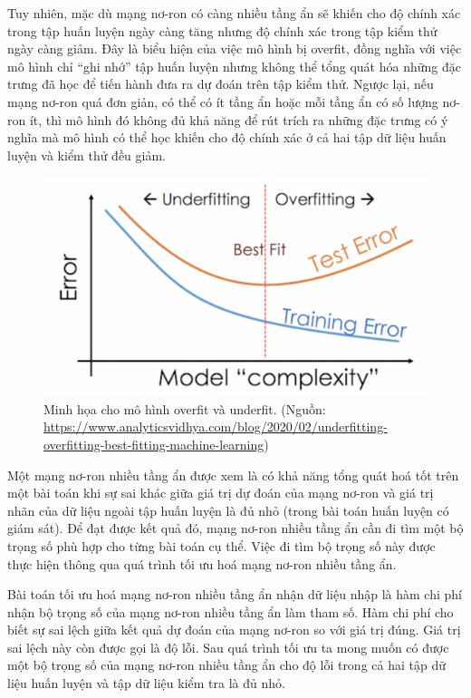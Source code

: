 Tuy nhiên, mặc dù mạng nơ-ron có càng nhiều tầng ẩn sẽ khiến cho độ chính xác trong tập huấn luyện ngày càng tăng nhưng độ chính xác trong tập kiểm thử ngày càng giảm. Đây là biểu hiện của việc mô hình bị overfit, đồng nghĩa với việc mô hình chỉ ``ghi nhớ'' tập huấn luyện nhưng không thể tổng quát hóa những đặc trưng đã học để tiến hành đưa ra dự đoán trên tập kiểm thử. Ngược lại, nếu mạng nơ-ron quá đơn giản, có thể có ít tầng ẩn hoặc mỗi tầng ẩn có số lượng nơ-ron ít, thì mô hình đó không đủ khả năng để rút trích ra những đặc trưng có ý nghĩa mà mô hình có thể học khiến cho độ chính xác ở cả hai tập dữ liệu huấn luyện và kiểm thử đều giảm.

\begin{figure}[htp]
\centering
\includegraphics[width=100 mm]{images/under-over.png}
\caption{Minh họa cho mô hình overfit và underfit. (Nguồn: \url{https://www.analyticsvidhya.com/blog/2020/02/underfitting-overfitting-best-fitting-machine-learning})}
\label{fig:under-over}
\end{figure}

Một mạng nơ-ron nhiều tầng ẩn được xem là có khả năng tổng quát hoá tốt trên một bài toán khi sự sai khác giữa giá trị dự đoán của mạng nơ-ron và giá trị nhãn của dữ liệu ngoài tập huấn luyện là đủ nhỏ (trong bài toán huấn luyện có giám sát). Để đạt được kết quả đó, mạng nơ-ron nhiều tầng ẩn cần đi tìm một bộ trọng số phù hợp cho từng bài toán cụ thể. Việc đi tìm bộ trọng số này được thực hiện thông qua quá trình tối ưu hoá mạng nơ-ron nhiều tầng ẩn.

Bài toán tối ưu hoá mạng nơ-ron nhiều tầng ẩn nhận dữ liệu nhập là hàm chi phí nhận bộ trọng số của mạng nơ-ron nhiều tầng ẩn làm tham số. Hàm chi phí cho biết sự sai lệch giữa kết quả dự đoán của mạng nơ-ron so với giá trị đúng. Giá trị sai lệch này còn được gọi là độ lỗi. Sau quá trình tối ưu ta mong muốn có được một bộ trọng số của mạng nơ-ron nhiều tầng ẩn cho độ lỗi trong cả hai tập dữ liệu huấn luyện và tập dữ liệu kiểm tra là đủ nhỏ.

